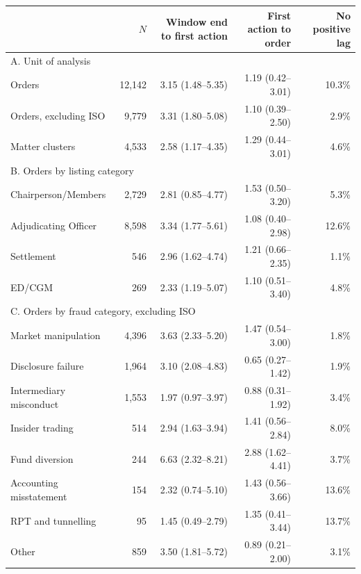 \begin{tabular*}{\textwidth}[]{l@{\extracolsep\fill}rrrr}
\toprule
 & $N$ & Window end to first action & First action to order & No positive lag\\
\midrule
\multicolumn{5}{l}{A. Unit of analysis}\\
Orders & 12,142 & 3.15 (1.48--5.35) & 1.19 (0.42--3.01) & 10.3\%\\
Orders, excluding ISO & 9,779 & 3.31 (1.80--5.08) & 1.10 (0.39--2.50) & 2.9\%\\
Matter clusters & 4,533 & 2.58 (1.17--4.35) & 1.29 (0.44--3.01) & 4.6\%\\
\midrule
\multicolumn{5}{l}{B. Orders by listing category}\\
Chairperson/Members & 2,729 & 2.81 (0.85--4.77) & 1.53 (0.50--3.20) & 5.3\%\\
Adjudicating Officer & 8,598 & 3.34 (1.77--5.61) & 1.08 (0.40--2.98) & 12.6\%\\
Settlement & 546 & 2.96 (1.62--4.74) & 1.21 (0.66--2.35) & 1.1\%\\
ED/CGM & 269 & 2.33 (1.19--5.07) & 1.10 (0.51--3.40) & 4.8\%\\
\midrule
\multicolumn{5}{l}{C. Orders by fraud category, excluding ISO}\\
Market manipulation & 4,396 & 3.63 (2.33--5.20) & 1.47 (0.54--3.00) & 1.8\%\\
Disclosure failure & 1,964 & 3.10 (2.08--4.83) & 0.65 (0.27--1.42) & 1.9\%\\
Intermediary misconduct & 1,553 & 1.97 (0.97--3.97) & 0.88 (0.31--1.92) & 3.4\%\\
Insider trading & 514 & 2.94 (1.63--3.94) & 1.41 (0.56--2.84) & 8.0\%\\
Fund diversion & 244 & 6.63 (2.32--8.21) & 2.88 (1.62--4.41) & 3.7\%\\
Accounting misstatement & 154 & 2.32 (0.74--5.10) & 1.43 (0.56--3.66) & 13.6\%\\
RPT and tunnelling & 95 & 1.45 (0.49--2.79) & 1.35 (0.41--3.44) & 13.7\%\\
Other & 859 & 3.50 (1.81--5.72) & 0.89 (0.21--2.00) & 3.1\%\\
\bottomrule
\end{tabular*}
